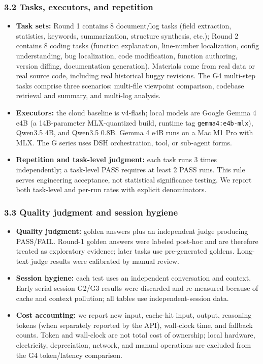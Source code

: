 \documentclass[
]{article}
\begin{document}
\subsubsection{3.2 Tasks, executors, and repetition}
\begin{itemize}
\item \textbf{Task sets:} Round 1 contains 8 document/log tasks (field extraction, statistics, keywords, summarization, structure synthesis, etc.); Round 2 contains 8 coding tasks (function explanation, line-number localization, config understanding, bug localization, code modification, function authoring, version diffing, documentation generation). Materials come from real data or real source code, including real historical buggy revisions. The G4 multi-step tasks comprise three scenarios: multi-file viewpoint comparison, codebase retrieval and summary, and multi-log analysis.
\item \textbf{Executors:} the cloud baseline is v4-flash; local models are Google Gemma 4 e4B (a 14B-parameter MLX-quantized build, runtime tag \texttt{gemma4:e4b-mlx}), Qwen3.5 4B, and Qwen3.5 0.8B. Gemma 4 e4B runs on a Mac M1 Pro with MLX. The G series uses DSH orchestration, tool, or sub-agent forms.
\item \textbf{Repetition and task-level judgment:} each task runs 3 times independently; a task-level PASS requires at least 2 PASS runs. This rule serves engineering acceptance, not statistical significance testing. We report both task-level and per-run rates with explicit denominators.
\end{itemize}

\subsubsection{3.3 Quality judgment and session hygiene}
\begin{itemize}
\item \textbf{Quality judgment:} golden answers plus an independent judge producing PASS/FAIL. Round-1 golden answers were labeled post-hoc and are therefore treated as exploratory evidence; later tasks use pre-generated goldens. Long-text judge results were calibrated by manual review.
\item \textbf{Session hygiene:} each test uses an independent conversation and context. Early serial-session G2/G3 results were discarded and re-measured because of cache and context pollution; all tables use independent-session data.
\item \textbf{Cost accounting:} we report new input, cache-hit input, output, reasoning tokens (when separately reported by the API), wall-clock time, and fallback counts. Token and wall-clock are not total cost of ownership; local hardware, electricity, depreciation, network, and manual operations are excluded from the G4 token/latency comparison.
\end{itemize}
\end{document}
